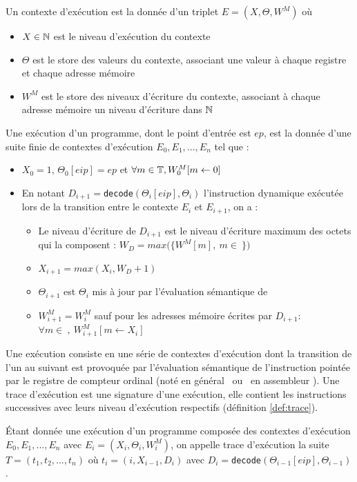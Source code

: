 \begin{defi}
Un contexte d'exécution est la donnée d'un triplet $E=(X, \Theta, W^M)$ où
\begin{itemize}
 \item $X\in\mathbb N$ est le niveau d'exécution du contexte
 \item $\Theta$ est le store des valeurs du contexte, associant une valeur à chaque registre et chaque adresse mémoire
 \item $W^M$ est le store des niveaux d'écriture du contexte, associant à chaque adresse mémoire un niveau d'écriture dans $\mathbb N$
\end{itemize}
Une exécution d'un programme, dont le point d'entrée est $ep$, est la donnée d'une suite finie de contextes d'exécution $E_0, E_1, ..., E_n$ tel que :
\begin{itemize}
 \item $X_0=1$, $\Theta_0[eip]=ep$ et $\forall m\in \mathbb T, W_0^M[m\leftarrow 0]$
 \item En notant $D_{i+1}=$\texttt{decode}$(\Theta_i[eip], \Theta_i)$ l'instruction dynamique exécutée lors de la transition entre le contexte $E_i$ et $E_{i+1}$, on a :
    \begin{itemize}
     \item Le niveau d'écriture de $D_{i+1}$ est le niveau d'écriture maximum des octets qui la composent : $W_D=max(\{W^M[m],\ m\in\ $$\})$
     \item $X_{i+1}=max(X_i, W_D+1)$
     \item $\Theta_{i+1}$ est $\Theta_i$ mis à jour par l'évaluation sémantique de 
     \item $W_{i+1}^M=W_{i}^M$ sauf pour les adresses mémoire écrites par $D_{i+1}$:\\ $\forall m\in\ $$,\ W_{i+1}^M[m\leftarrow X_i]$
    \end{itemize}
\end{itemize}
\label{def:contexte_exec}
\end{defi}

Une exécution consiste en une série de contextes d'exécution dont la transition de l'un au suivant est provoquée par l'évaluation sémantique de l'instruction pointée par le registre de compteur ordinal (noté en général \pc\ ou \eip\ en assembleur \xq). Une trace d'exécution est une signature d'une exécution, elle contient les instructions successives avec leurs niveau d'exécution respectifs (définition \ref{def:trace}).

\begin{defi}
Étant donnée une exécution d'un programme composée des contextes d'exécution $E_0, E_1, ..., E_n$ avec $E_i=(X_i, \Theta_i, W_i^M)$, on appelle trace d'exécution la suite $T=(t_1, t_2, ..., t_n)$ où $t_i=(i, X_{i-1}, D_i)$ avec $D_i=$\texttt{decode}$(\Theta_{i-1}[eip], \Theta_{i-1})$.
\label{def:trace}
\end{defi}

